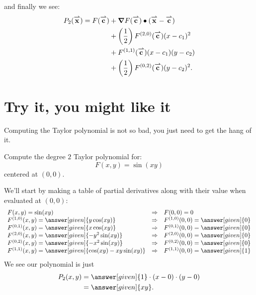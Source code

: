 \documentclass{ximera}
\begin{document}
and finally we see:
\begin{align*}
P_2({\overset{\boldsymbol{\rightharpoonup}}{\mathbf{x}}})=F({\overset{\boldsymbol{\rightharpoonup}}{\mathbf{c}}})
&+ \boldsymbol\nabla F({\overset{\boldsymbol{\rightharpoonup}}{\mathbf{c}}})\bullet ({\overset{\boldsymbol{\rightharpoonup}}{\mathbf{x}}}-{\overset{\boldsymbol{\rightharpoonup}}{\mathbf{c}}})\\
&+\left(\frac{1}{2}\right)F^{(2,0)}({\overset{\boldsymbol{\rightharpoonup}}{\mathbf{c}}}) (x-c_1)^2 \\
&+ F^{(1,1)}({\overset{\boldsymbol{\rightharpoonup}}{\mathbf{c}}})(x-c_1)(y-c_2) \\
&+ \left(\frac{1}{2}\right)F^{(0,2)}({\overset{\boldsymbol{\rightharpoonup}}{\mathbf{c}}})(y-c_2)^2.
\end{align*}


\section{Try it, you might like it}

Computing the Taylor polynomial is not so bad, you just need to get the hang of it. 

\begin{example}
  Compute the degree $2$ Taylor polynomial for:
  \[
  F(x,y)=\sin(xy)
  \]
  centered at $(0,0)$.
  \begin{explanation}
    We'll start by making a table of partial derivatives along with
    their value when evaluated at $(0,0)$:
    \[
    \begin{array}{lcl}
      F(x,y) = \sin(xy) & \Rightarrow &F(0,0) = 0\\
      F^{(1,0)}(x,y) = \answer[given]{y\cos(xy)} & \Rightarrow & F^{(1,0)}(0,0) = \answer[given]{0}\\
      F^{(0,1)}(x,y) = \answer[given]{x\cos(xy)} &\Rightarrow  & F^{(0,1)}(0,0) = \answer[given]{0}\\
      F^{(2,0)}(x,y) = \answer[given]{-y^2\sin(xy)} &\Rightarrow & F^{(2,0)}(0,0) = \answer[given]{0}\\
      F^{(0,2)}(x,y) = \answer[given]{-x^2\sin(xy)} &\Rightarrow & F^{(0,2)}(0,0) = \answer[given]{0}\\
      F^{(1,1)}(x,y) = \answer[given]{\cos(xy)-xy\sin(xy)} &\Rightarrow & F^{(1,1)}(0,0) = \answer[given]{1}
    \end{array}
    \]
    We see our polynomial is just
    \begin{align*}
      P_2(x,y) &= \answer[given]{1}\cdot (x-0)\cdot (y-0)\\
      &= \answer[given]{xy}.
    \end{align*}
  \end{explanation}
\end{example}
\end{document}
